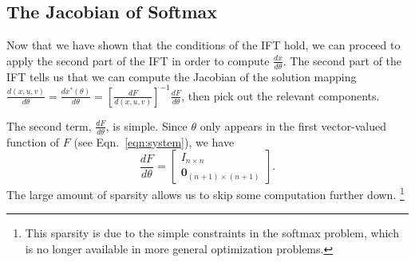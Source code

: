 \documentclass[11pt]{article}
\begin{document}
\subsection{The Jacobian of Softmax}
Now that we have shown that the conditions of the IFT hold,
we can proceed to apply the second part of the IFT in order to compute $\frac{dx}{d\theta}$.
The second part of the IFT tells us that we can compute the Jacobian of the
solution mapping $\frac{d(x,u,v)}{d\theta} = \frac{dx^*(\theta)}{d\theta}
= \left[\frac{dF}{d(x,u,v)}\right]^{-1}\frac{dF}{d\theta}$,
then pick out the relevant components.

The second term, $\frac{dF}{d\theta}$, is simple.
Since $\theta$ only appears in the first vector-valued function of $F$
(see Eqn.~\ref{eqn:system}), we have
\begin{equation}
\label{eqn:df-dtheta}
\frac{dF}{d\theta} = \begin{bmatrix}
    I_{n\times n}\\
    \mathbf{0}_{(n+1)\times (n+1)}
\end{bmatrix}.
\end{equation}
The large amount of sparsity allows us to skip some computation further down.
\footnote{This sparsity is due to the simple constraints in the softmax problem,
which is no longer available in more general optimization problems.}
\end{document}
